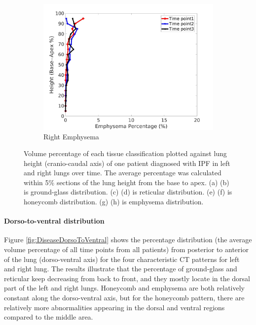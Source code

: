 \begin{figure}[H]
\begin{subfigure}{.42\linewidth}
  \includegraphics[width=\linewidth,trim={{.0\wd0} {.0\wd0} {.0\wd0} {.0\wd0}},clip]{QuantitativeAnalysis/Image/IPF21RightLungEmphysemaDiseaseAgainstHeight.jpg}
  \caption{Right Emphysema}
  \label{fig:IPF21DiseaseAgainstHeightMain-h}
\end{subfigure}
\caption{Volume percentage of each tissue classification plotted against lung height (cranio-caudal axis) of one patient diagnosed with IPF in left and right lungs over time. The average percentage was calculated within 5\% sections of the lung height from the base to apex. (a) (b) is ground-glass distribution. (c) (d) is reticular distribution. (e) (f) is honeycomb distribution. (g) (h) is emphysema distribution.}
\label{fig:IPF21DiseaseAgainstHeightMain}
\end{figure}

\paragraph{Dorso-to-ventral distribution}
Figure \ref{fig:DiseaseDorsoToVentral} shows the percentage distribution (the average volume percentage of all time points from all patients) from posterior to anterior of the lung (dorso-ventral axis) for the four characteristic CT patterns for left and right lung. The results illustrate that the percentage of ground-glass and reticular keep decreasing from back to front, and they mostly locate in the dorsal part of the left and right lungs. Honeycomb and emphysema are both relatively constant along the dorso-ventral axis, but for the honeycomb pattern, there are relatively more abnormalities appearing in the dorsal and ventral regions compared to the middle area.

